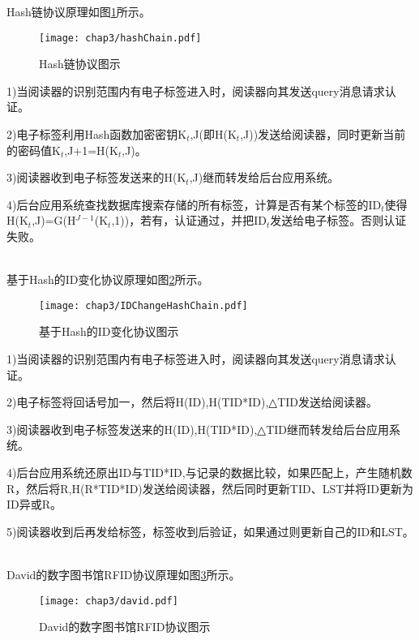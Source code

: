 Hash链协议原理如图\ref{fig:Hash链协议图示}所示。

\begin{figure}[!htp]
	\centering
	\texttt{[image: chap3/hashChain.pdf]}
	\caption{Hash链协议图示}\label{fig:Hash链协议图示}
\end{figure}

1)当阅读器的识别范围内有电子标签进入时，阅读器向其发送query消息请求认证。

2)电子标签利用Hash函数加密密钥K$_{t}$,J(即H(K$_{t}$,J))发送给阅读器，同时更新当前的密码值K$_{t}$,J+1=H(K$_{t}$,J)。

3)阅读器收到电子标签发送来的H(K$_{t}$,J)继而转发给后台应用系统。

4)后台应用系统查找数据库搜索存储的所有标签，计算是否有某个标签的ID$_{t}$使得H(K$_{t}$,J)=G(H$^{J-1}$(K$_{t}$,1))，若有，认证通过，并把ID$_{t}$发送给电子标签。否则认证失败。

\\

基于Hash的ID变化协议原理如图\ref{fig:基于Hash的ID变化协议图示}所示。

\begin{figure}[!htp]
	\centering
	\texttt{[image: chap3/IDChangeHashChain.pdf]}
	\caption{基于Hash的ID变化协议图示}\label{fig:基于Hash的ID变化协议图示}
\end{figure}

1)当阅读器的识别范围内有电子标签进入时，阅读器向其发送query消息请求认证。

2)电子标签将回话号加一，然后将H(ID),H(TID*ID),△TID发送给阅读器。

3)阅读器收到电子标签发送来的H(ID),H(TID*ID),△TID继而转发给后台应用系统。

4)后台应用系统还原出ID与TID*ID,与记录的数据比较，如果匹配上，产生随机数R，然后将R,H(R*TID*ID)发送给阅读器，然后同时更新TID、LST并将ID更新为ID异或R。

5)阅读器收到后再发给标签，标签收到后验证，如果通过则更新自己的ID和LST。

\\

David的数字图书馆RFID协议原理如图\ref{fig:David的数字图书馆RFID协议图示}所示。

\begin{figure}[!htp]
	\centering
	\texttt{[image: chap3/david.pdf]}
	\caption{David的数字图书馆RFID协议图示}\label{fig:David的数字图书馆RFID协议图示}
\end{figure}

